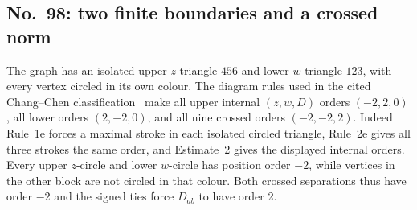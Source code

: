 \documentclass[11pt]{amsart}
\theoremstyle{remark}
\begin{document}
\subsection{No.~98: two finite boundaries and a crossed norm}
The graph has an isolated upper $z$-triangle $456$ and lower $w$-triangle $123$, with every vertex circled in its own colour. The diagram rules used in the cited Chang--Chen classification~\cite{CCI} make all upper internal $(z,w,D)$ orders $(-2,2,0)$, all lower orders $(2,-2,0)$, and all nine crossed orders $(-2,-2,2)$. Indeed Rule~1e forces a maximal stroke in each isolated circled triangle, Rule~2e gives all three strokes the same order, and Estimate~2 gives the displayed internal orders. Every upper $z$-circle and lower $w$-circle has position order $-2$, while vertices in the other block are not circled in that colour. Both crossed separations thus have order $-2$ and the signed ties force $D_{ab}$ to have order 2.
\end{document}
